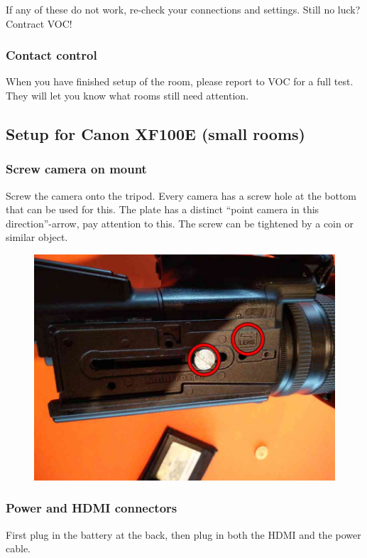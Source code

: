 \documentclass{article}
\begin{document}
If any of these do not work, re-check your connections and settings. Still no luck? Contract VOC!

\subsubsection{Contact control}
When you have finished setup of the room, please report to VOC for a full test.
They will let you know what rooms still need attention.

\subsection{Setup for Canon XF100E (small rooms)}

\subsubsection{Screw camera on mount}
Screw the camera onto the tripod. Every camera has a screw hole at the bottom that can be used for this. The plate has a distinct ``point camera in this direction''-arrow, pay attention to this. The screw can be tightened by a coin or similar object.

\begin{figure}[H]
  \centering
  \includegraphics[width = 120mm]{Cam00.jpg}
\end{figure}


\subsubsection{Power and HDMI connectors}
First plug in the battery at the back, then plug in both the HDMI and the power cable.
\end{document}
